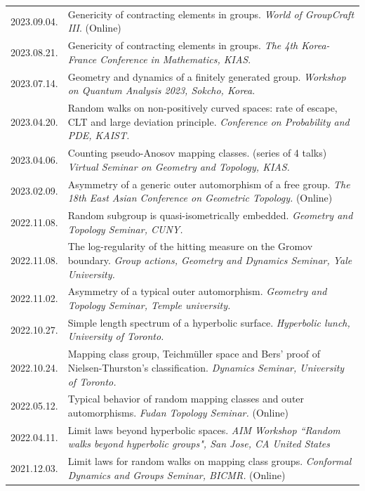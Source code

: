 \documentclass[a4paper, 10pt]{article}
\begin{document}
\begin{tabular}{Q{2.45cm}P{13cm}}
\small{2023.09.04.} & Genericity of contracting elements in groups. \textit{World of GroupCraft III}. (Online) \\
\small{2023.08.21.} & Genericity of contracting elements in groups. \textit{The 4th Korea-France Conference in Mathematics, KIAS}. \\
\small{2023.07.14.} & Geometry and dynamics of a finitely generated group. \textit{Workshop on Quantum Analysis 2023, Sokcho, Korea}. \\
\small{2023.04.20.} & Random walks on non-positively curved spaces: rate of escape, CLT and large deviation principle. \textit{Conference on Probability and PDE, KAIST.}\\
\small{2023.04.06.} &Counting pseudo-Anosov mapping classes. (series of 4 talks) \textit{Virtual Seminar on Geometry and Topology, KIAS.}\\
\small{2023.02.09.} & Asymmetry of a generic outer automorphism of a free group. \textit{The 18th East Asian Conference on Geometric Topology.} (Online)\\
\small{2022.11.08.} & Random subgroup is quasi-isometrically embedded. \textit{Geometry and Topology Seminar, CUNY.}\\
\small{2022.11.08.} & The log-regularity of the hitting measure on the Gromov boundary. \textit{Group actions, Geometry and Dynamics Seminar, Yale University.}\\
\small{2022.11.02.} & Asymmetry of a typical outer automorphism. \textit{Geometry and Topology Seminar, Temple university.}\\
\small{2022.10.27.} & Simple length spectrum of a hyperbolic surface. \textit{Hyperbolic lunch, University of Toronto.} \\
\small{2022.10.24.} & Mapping class group, Teichmüller space and Bers' proof of Nielsen-Thurston's classification. \textit{Dynamics Seminar, University of Toronto.} \\
\small{2022.05.12.} & Typical behavior of random mapping classes and outer automorphisms. \textit{Fudan Topology Seminar.} (Online) \\
\small{2022.04.11.} &  Limit laws beyond hyperbolic spaces. \textit{AIM Workshop ``Random walks beyond hyperbolic groups", San Jose, CA United States}\\
\small{2021.12.03.} & Limit laws for random walks on mapping class groups. \textit{Conformal Dynamics and Groups Seminar, BICMR.} (Online) \\

\end{tabular}
\end{document}
